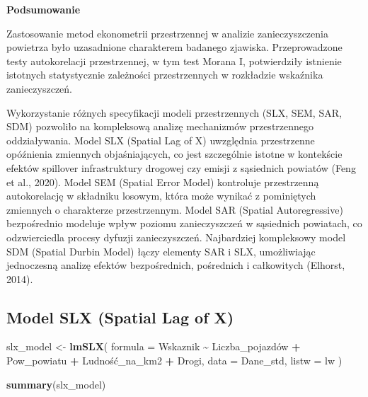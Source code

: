 \documentclass[
  11pt,
]{article}
\newenvironment{Shaded}{\begin{snugshade}}{\end{snugshade}}
\newcommand{\AttributeTok}[1]{\textcolor[rgb]{0.13,0.29,0.53}{#1}}
\newcommand{\FunctionTok}[1]{\textcolor[rgb]{0.13,0.29,0.53}{\textbf{#1}}}
\newcommand{\NormalTok}[1]{#1}
\newcommand{\OtherTok}[1]{\textcolor[rgb]{0.56,0.35,0.01}{#1}}
\newcommand{\SpecialCharTok}[1]{\textcolor[rgb]{0.81,0.36,0.00}{\textbf{#1}}}
\begin{document}
\textbf{Podsumowanie}

Zastosowanie metod ekonometrii przestrzennej w analizie zanieczyszczenia
powietrza było uzasadnione charakterem badanego zjawiska. Przeprowadzone
testy autokorelacji przestrzennej, w tym test Morana I, potwierdziły
istnienie istotnych statystycznie zależności przestrzennych w rozkładzie
wskaźnika zanieczyszczeń.

Wykorzystanie różnych specyfikacji modeli przestrzennych (SLX, SEM, SAR,
SDM) pozwoliło na kompleksową analizę mechanizmów przestrzennego
oddziaływania. Model SLX (Spatial Lag of X) uwzględnia przestrzenne
opóźnienia zmiennych objaśniających, co jest szczególnie istotne w
kontekście efektów spillover infrastruktury drogowej czy emisji z
sąsiednich powiatów (Feng et al., 2020). Model SEM (Spatial Error Model)
kontroluje przestrzenną autokorelację w składniku losowym, która może
wynikać z pominiętych zmiennych o charakterze przestrzennym. Model SAR
(Spatial Autoregressive) bezpośrednio modeluje wpływ poziomu
zanieczyszczeń w sąsiednich powiatach, co odzwierciedla procesy dyfuzji
zanieczyszczeń. Najbardziej kompleksowy model SDM (Spatial Durbin Model)
łączy elementy SAR i SLX, umożliwiając jednoczesną analizę efektów
bezpośrednich, pośrednich i całkowitych (Elhorst, 2014).

\subsection{Model SLX (Spatial Lag of
X)}\label{model-slx-spatial-lag-of-x}

\begin{Shaded}
\begin{Highlighting}[]
\NormalTok{slx\_model }\OtherTok{\textless{}{-}} \FunctionTok{lmSLX}\NormalTok{(}
  \AttributeTok{formula =}\NormalTok{ Wskaznik }\SpecialCharTok{\textasciitilde{}}\NormalTok{ Liczba\_pojazdów }\SpecialCharTok{+}
\NormalTok{    Pow\_powiatu }\SpecialCharTok{+}
\NormalTok{    Ludność\_na\_km2 }\SpecialCharTok{+}
\NormalTok{    Drogi,}
  \AttributeTok{data =}\NormalTok{ Dane\_std,}
  \AttributeTok{listw =}\NormalTok{ lw}
\NormalTok{)}

\FunctionTok{summary}\NormalTok{(slx\_model)}
\end{Highlighting}
\end{Shaded}
\end{document}
